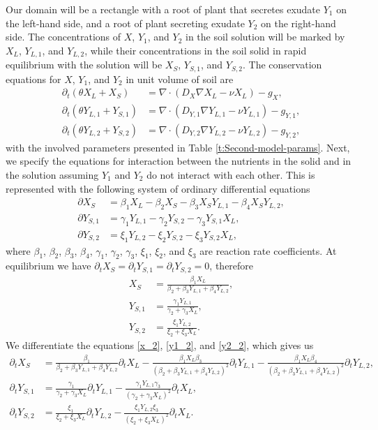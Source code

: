 \documentclass[11pt]{article}
\numberwithin{equation}{section}
\begin{document}
Our domain will be a rectangle with a root of plant that secretes exudate $Y_1$ on the left-hand side, and a root of plant secreting exudate $Y_2$ on the right-hand side. The concentrations of $X$, $Y_1$, and $Y_2$ in the soil solution will be marked by $X_L$, $Y_{L,1}$, and $Y_{L,2}$, while their concentrations in the soil solid in rapid equilibrium with the solution will be $X_S$, $Y_{S,1}$, and $Y_{S,2}$. The conservation equations for $X$, $Y_1$, and $Y_2$ in unit volume of soil are
\begin{align}
	\partial_t(\theta X_L + X_S) &= \nabla \cdot(D_X \nabla X_L - \nu X_L) - g_X, \label{x_1}\\
	\partial_t(\theta Y_{L,1} + Y_{S,1}) &= \nabla \cdot(D_{Y,1} \nabla Y_{L,1} - \nu Y_{L,1}) - g_{Y,1}, \label{y1_1} \\
	\partial_t(\theta Y_{L,2} + Y_{S,2}) &= \nabla \cdot(D_{Y,2} \nabla Y_{L,2} - \nu Y_{L,2}) - g_{Y,2}, \label{y2_1}		
\end{align}
with the involved parameters presented in Table \ref{t:Second-model-params}. Next, we specify the equations for interaction between the nutrients in the solid and in the solution assuming $Y_1$ and $Y_2$ do not interact with each other. This is represented with the following system of ordinary differential equations
\begin{align}
	\partial X_S &= \beta_1 X_L - \beta_2 X_S - \beta_3 X_S Y_{L,1} - \beta_4 X_S Y_{L,2}, \\
	\partial Y_{S,1} &= \gamma_1 Y_{L,1} - \gamma_2 Y_{S,2} - \gamma_3 Y_{S,1} X_L, \\
	\partial Y_{S,2} &= \xi_1 Y_{L,2} - \xi_2 Y_{S,2} - \xi_3 Y_{S,2} X_L,
\end{align}	
where $\beta_1$, $\beta_2$, $\beta_3$, $\beta_4$, $\gamma_1$, $\gamma_2$, $\gamma_3$, $\xi_1$, $\xi_2$, and $\xi_3$ are reaction rate coefficients. At equilibrium we have $\partial_t X_S = \partial_t Y_{S,1} = \partial_t Y_{S,2} = 0$, therefore
\begin{align}
	X_S &= \frac{\beta_1 X_L}{\beta_2 + \beta_3Y_{L,1} + \beta_4 Y_{L,2}}, \label{x_2} \\
	Y_{S,1} &= \frac{\gamma_1 Y_{L,1}}{\gamma_2 + \gamma_3X_L}, \label{y1_2} \\
	Y_{S,2} &= \frac{\xi_1 Y_{L,2}}{\xi_2 + \xi_3X_L}. \label{y2_2}
\end{align}
We differentiate the equations \eqref{x_2}, \eqref{y1_2}, and \eqref{y2_2}, which gives us 
\begin{align}
	\partial_t X_S &= \frac{\beta_1}{\beta_2 + \beta_3 Y_{L,1} + \beta_4 Y_{L,2}} \partial_t X_L - \frac{\beta_1 X_L \beta_3}{(\beta_2 + \beta_3 Y_{L,1} + \beta_4 Y_{L,2})^2} \partial_t Y_{L,1}
	- \frac{\beta_1 X_L \beta_4}{(\beta_2 + \beta_3 Y_{L,1} + \beta_4 Y_{L,2})^2} \partial_t Y_{L,2}, 
	\label{x_3}
	\\
	\partial_t Y_{S,1} &= \frac{\gamma_1}{\gamma_2 + \gamma_3 X_L} \partial_t Y_{L,1} - \frac{\gamma_1 Y_{L,1} \gamma_3}{(\gamma_2 + \gamma_3 X_L)^2} \partial_t X_L, \label{y1_3}
	\\
	\partial_t Y_{S,2} &= \frac{\xi_1}{\xi_2 + \xi_3 X_L} \partial_t Y_{L,2} - \frac{\xi_1 Y_{L,2} \xi_3}{(\xi_2 + \xi_3 X_L)^2} \partial_t X_L. \label{y2_3}
\end{align} 
\end{document}
